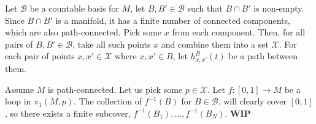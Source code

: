 \documentclass[aps,pra,showpacs,notitlepage,onecolumn,superscriptaddress,nofootinbib]{revtex4-1}
\theoremstyle{definition}
\begin{document}
\noindent
Let $\mathcal{B}$ be a countable basis for $M$, let $B, B' \in \mathcal{B}$ such that $B \cap B'$ is non-empty. Since $B \cap B'$ is a manifold, it has a finite number of connected components, which
are also path-connected. Pick some $x$ from each component. Then, for all pairs of $B, B' \in \mathcal{B}$, take all such points $x$ and combine them into a set $\mathcal{X}$. For each pair of points $x, x' \in \mathcal{X}$ where $x, x' \in B$,
let $h_{x, x'}^{B}(t)$ be a path between them.

Assume $M$ is path-connected. Let us pick some $p \in \mathcal{X}$. Let $f : [0, 1] \rightarrow M$ be a loop in $\pi_1(M, p)$. The collection of $f^{-1}(B)$ for $B \in \mathcal{B}$. will clearly cover $[0, 1]$,
so there exists a finite subcover, $f^{-1}(B_1), \dots, f^{-1}(B_N)$. \textbf{WIP}


\hrulefill

\end{document}
